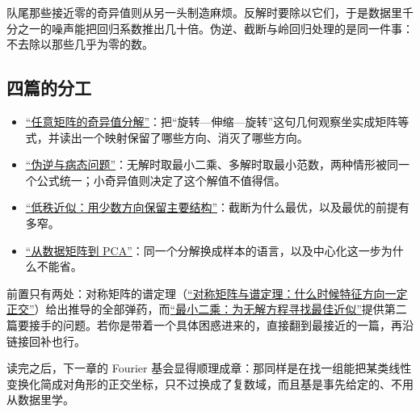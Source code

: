 队尾那些接近零的奇异值则从另一头制造麻烦。反解时要除以它们，于是数据里千分之一的噪声能把回归系数推出几十倍。伪逆、截断与岭回归处理的是同一件事：不去除以那些几乎为零的数。

\subsection{四篇的分工}

\begin{itemize}
\tightlist
\item \hyperref[sec:03-Linear-Algebra/07-SVD-and-Data-Applications/01]{``任意矩阵的奇异值分解''}：把``旋转—伸缩—旋转''这句几何观察坐实成矩阵等式，并读出一个映射保留了哪些方向、消灭了哪些方向。
\item \hyperref[sec:03-Linear-Algebra/07-SVD-and-Data-Applications/02]{``伪逆与病态问题''}：无解时取最小二乘、多解时取最小范数，两种情形被同一个公式统一；小奇异值则决定了这个解值不值得信。
\item \hyperref[sec:03-Linear-Algebra/07-SVD-and-Data-Applications/03]{``低秩近似：用少数方向保留主要结构''}：截断为什么最优，以及最优的前提有多窄。
\item \hyperref[sec:03-Linear-Algebra/07-SVD-and-Data-Applications/04]{``从数据矩阵到 PCA''}：同一个分解换成样本的语言，以及中心化这一步为什么不能省。
\end{itemize}

前置只有两处：对称矩阵的谱定理（\hyperref[sec:03-Linear-Algebra/06-Symmetric-and-Positive-Definite-Matrices/01]{``对称矩阵与谱定理：什么时候特征方向一定正交''}）给出推导的全部弹药，而\hyperref[sec:03-Linear-Algebra/03-Orthogonality/03]{``最小二乘：为无解方程寻找最佳近似''}提供第二篇要接手的问题。若你是带着一个具体困惑进来的，直接翻到最接近的一篇，再沿链接回补也行。

读完之后，下一章的 Fourier 基会显得顺理成章：那同样是在找一组能把某类线性变换化简成对角形的正交坐标，只不过换成了复数域，而且基是事先给定的、不用从数据里学。
